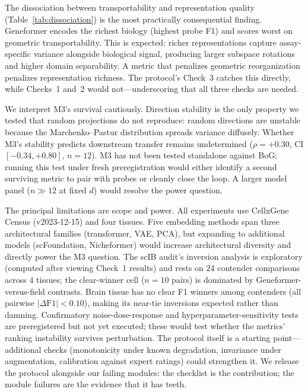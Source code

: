 \documentclass[9pt,lineno]{elife}
\begin{document}
The dissociation between transportability and representation quality (Table~\ref{tab:dissociation}) is the most practically consequential finding. Geneformer encodes the richest biology (highest probe F1) and scores worst on geometric transportability. This is expected: richer representations capture assay-specific variance alongside biological signal, producing larger subspace rotations and higher domain separability. A metric that penalizes geometric reorganization penalizes representation richness. The protocol's Check~3 catches this directly, while Checks~1 and~2 would not---underscoring that all three checks are needed.

We interpret M3's survival cautiously. Direction stability is the only property we tested that random projections do not reproduce: random directions are unstable because the Marchenko--Pastur distribution spreads variance diffusely. Whether M3's stability predicts downstream transfer remains undetermined ($\rho = +0.30$, CI $[-0.34, +0.80]$, $n = 12$). M3 has not been tested standalone against BoG; running this test under fresh preregistration would either identify a second surviving metric to pair with probes or cleanly close the loop. A larger model panel ($n \gg 12$ at fixed $d$) would resolve the power question.

The principal limitations are scope and power. All experiments use CellxGene Census (v2023-12-15) and four tissues. Five embedding methods span three architectural families (transformer, VAE, PCA), but expanding to additional models (scFoundation, Nicheformer) would increase architectural diversity and directly power the M3 question. The scIB audit's inversion analysis is exploratory (computed after viewing Check~1 results) and rests on 24 contender comparisons across 4 tissues; the clear-winner cell ($n = 10$ pairs) is dominated by Geneformer-versus-field contrasts. Brain tissue has no clear F1 winners among contenders (all pairwise $|\Delta\text{F1}| < 0.10$), making its near-tie inversions expected rather than damning. Confirmatory noise-dose-response and hyperparameter-sensitivity tests are preregistered but not yet executed; these would test whether the metrics' ranking instability survives perturbation. The protocol itself is a starting point---additional checks (monotonicity under known degradation, invariance under augmentation, calibration against expert ratings) could strengthen it. We release the protocol alongside our failing modules: the checklist is the contribution; the module failures are the evidence that it has teeth.
\end{document}
